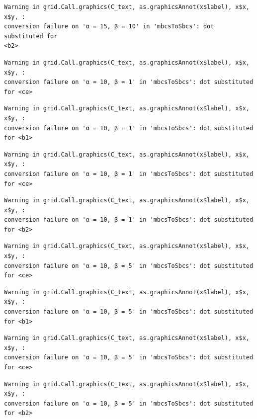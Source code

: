 \documentclass[
  spanish,
  a4paper,
]{scrreport}
\theoremstyle{plain}
\theoremstyle{definition}
\theoremstyle{definition}
\theoremstyle{remark}
\begin{document}
\begin{verbatim}
Warning in grid.Call.graphics(C_text, as.graphicsAnnot(x$label), x$x, x$y, :
conversion failure on 'α = 15, β = 10' in 'mbcsToSbcs': dot substituted for
<b2>
\end{verbatim}

\begin{verbatim}
Warning in grid.Call.graphics(C_text, as.graphicsAnnot(x$label), x$x, x$y, :
conversion failure on 'α = 10, β = 1' in 'mbcsToSbcs': dot substituted for <ce>
\end{verbatim}

\begin{verbatim}
Warning in grid.Call.graphics(C_text, as.graphicsAnnot(x$label), x$x, x$y, :
conversion failure on 'α = 10, β = 1' in 'mbcsToSbcs': dot substituted for <b1>
\end{verbatim}

\begin{verbatim}
Warning in grid.Call.graphics(C_text, as.graphicsAnnot(x$label), x$x, x$y, :
conversion failure on 'α = 10, β = 1' in 'mbcsToSbcs': dot substituted for <ce>
\end{verbatim}

\begin{verbatim}
Warning in grid.Call.graphics(C_text, as.graphicsAnnot(x$label), x$x, x$y, :
conversion failure on 'α = 10, β = 1' in 'mbcsToSbcs': dot substituted for <b2>
\end{verbatim}

\begin{verbatim}
Warning in grid.Call.graphics(C_text, as.graphicsAnnot(x$label), x$x, x$y, :
conversion failure on 'α = 10, β = 5' in 'mbcsToSbcs': dot substituted for <ce>
\end{verbatim}

\begin{verbatim}
Warning in grid.Call.graphics(C_text, as.graphicsAnnot(x$label), x$x, x$y, :
conversion failure on 'α = 10, β = 5' in 'mbcsToSbcs': dot substituted for <b1>
\end{verbatim}

\begin{verbatim}
Warning in grid.Call.graphics(C_text, as.graphicsAnnot(x$label), x$x, x$y, :
conversion failure on 'α = 10, β = 5' in 'mbcsToSbcs': dot substituted for <ce>
\end{verbatim}

\begin{verbatim}
Warning in grid.Call.graphics(C_text, as.graphicsAnnot(x$label), x$x, x$y, :
conversion failure on 'α = 10, β = 5' in 'mbcsToSbcs': dot substituted for <b2>
\end{verbatim}
\end{document}
